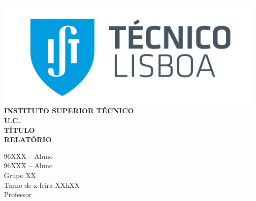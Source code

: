 \begin{titlepage}
    \setmainfont{Arial}
    \thispagestyle{date}
    \flushleft
    \includegraphics[scale = 0.3]{imagens/ist.png}\\[1.5 cm]
    \centering
    \textsc{\fontsize{18}{22}\textbf{INSTITUTO SUPERIOR TÉCNICO}}\\[2.6cm]
    \textsc{\fontsize{22}{27}\textbf{U.C.}}\\[1.5 cm]
    \textsc{\fontsize{23}{27}\textbf{TÍTULO}}\\[3.2 cm]
    \textsc{\fontsize{28}{34}\textbf{RELATÓRIO}}\\[5 cm]
    \begin{minipage}{0.5\textwidth}
        \quad
    \end{minipage}
    \begin{minipage}{0.49\textwidth}
        96XXX -- Aluno\\
        96XXX -- Aluno\\[1cm]
        Grupo XX\\
        Turno de x-feira XXhXX\\
        Professor
    \end{minipage}
\end{titlepage}